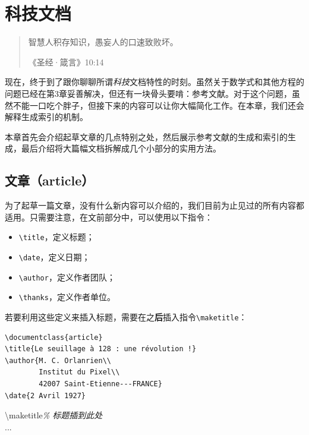 \chapter{科技文档}

\begin{quote}
    智慧人积存知识，愚妄人的口速致败坏。
    
    \hfill《圣经·箴言》10:14
\end{quote}

现在，终于到了跟你聊聊所谓\emph{科技}文档特性的时刻。虽然关于数学式和其他方程的问题已经在第3章妥善解决，但还有一块骨头要啃：参考文献。对于这个问题，虽然不能一口吃个胖子，但接下来的内容可以让你大幅简化工作。在本章，我们还会解释生成索引的机制。

本章首先会介绍起草文章的几点特别之处，然后展示参考文献的生成和索引的生成，最后介绍将大篇幅文档拆解成几个小部分的实用方法。

\section{文章（article）}

为了起草一篇文章，没有什么新内容可以介绍的，我们目前为止见过的所有内容都适用。只需要注意，在文前部分中，可以使用以下指令：

\begin{itemize}
    \item \verb|\title|，定义标题；
    \item \verb|\date|，定义日期；
    \item \verb|\author|，定义作者团队；
    \item \verb|\thanks|，定义作者单位。
\end{itemize}

若要利用这些定义来插入标题，需要在\verb||之\textbf{后}插入指令\verb|\maketitle|：

\begin{dmd}
\begin{verbatim}
\documentclass{article}
\title{Le seuillage à 128 : une révolution !}
\author{M. C. Orlanrien\\
        Institut du Pixel\\
        42007 Saint-Etienne---FRANCE}
\date{2 Avril 1927}

\end{verbatim}
\backslash maketitle\textsl{\% 标题插到此处}\\
...\\
\verb||
\end{dmd}

